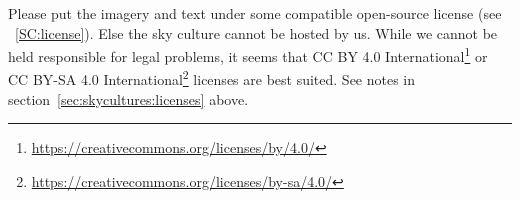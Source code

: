 Please put the imagery and text
under some compatible open-source license (see ~\ref{SC:license}).
Else the sky culture cannot be hosted by us.
While we cannot be held responsible for legal problems, it seems that
CC BY 4.0 International\footnote{\url{https://creativecommons.org/licenses/by/4.0/}} or
CC BY-SA 4.0 International\footnote{\url{https://creativecommons.org/licenses/by-sa/4.0/}}
licenses are best suited. See notes in section~\ref{sec:skycultures:licenses} above. 



